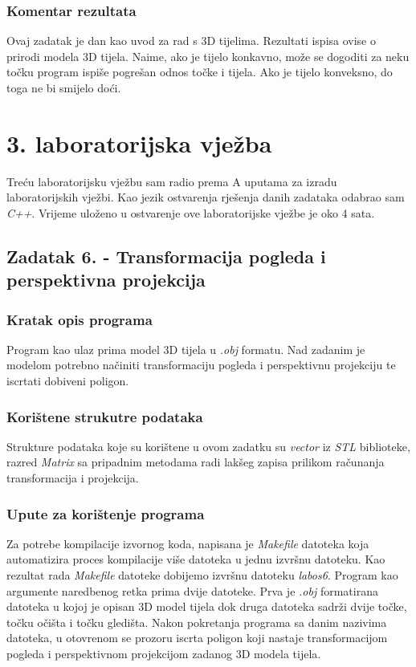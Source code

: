\documentclass{report}
\begin{document}
\subsection{Komentar rezultata}
Ovaj zadatak je dan kao uvod za rad s 3D tijelima. Rezultati ispisa ovise o prirodi modela 3D tijela. Naime, ako je tijelo konkavno, može se dogoditi za neku točku program ispiše pogrešan odnos točke i tijela. Ako je tijelo konveksno, do toga ne bi smijelo doći.

\chapter{3. laboratorijska vježba}
Treću laboratorijsku vježbu sam radio prema A uputama za izradu laboratorijskih vježbi. Kao jezik ostvarenja rješenja danih zadataka odabrao sam \textit{C++}. Vrijeme uloženo u ostvarenje ove laboratorijske vježbe je oko 4 sata. 

\section{Zadatak 6. - Transformacija pogleda i perspektivna projekcija}
\subsection{Kratak opis programa}
Program kao ulaz prima model 3D tijela u \textit{.obj} formatu. Nad zadanim je modelom potrebno načiniti transformaciju pogleda i perspektivnu projekciju te iscrtati dobiveni poligon.

\subsection{Korištene strukutre podataka}
Strukture podataka koje su korištene u ovom zadatku su \textit{vector} iz \textit{STL} biblioteke, razred \textit{Matrix} sa pripadnim metodama radi lakšeg zapisa prilikom računanja transformacija i projekcija.

\subsection{Upute za korištenje programa}
Za potrebe kompilacije izvornog koda, napisana je \textit{Makefile} datoteka koja automatizira proces kompilacije više datoteka u jednu izvršnu datoteku. Kao rezultat rada \textit{Makefile} datoteke dobijemo izvršnu datoteku \textit{labos6}. Program kao argumente naredbenog retka prima dvije datoteke. Prva je \textit{.obj} formatirana datoteka u kojoj je opisan 3D model tijela dok druga datoteka sadrži dvije točke, točku očišta i točku gledišta. Nakon pokretanja programa sa danim nazivima datoteka, u otovrenom se prozoru iscrta poligon koji nastaje transformacijom pogleda i perspektivnom projekcijom zadanog 3D modela tijela.
\end{document}
